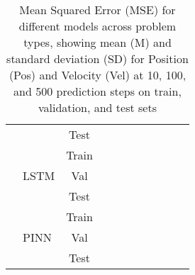 \documentclass[12pt,a4paper]{article}
\begin{document}
\begin{table}[htbp]
\begin{tabular}{@{}llccccccccc@{}}
  & & Test & & & & & & \\
  \cmidrule(lr){2-9}
  & \multirow{3}{*}{LSTM}
  & Train & & & & & & \\
  & & Val & & & & & & \\
  & & Test & & & & & & \\
  \cmidrule(lr){2-9}
  & \multirow{3}{*}{PINN}
  & Train & & & & & & \\
  & & Val & & & & & & \\
  & & Test & & & & & & \\
  \bottomrule
  \end{tabular}
  \caption{Mean Squared Error (MSE) for different models across problem types, showing mean (M) and standard deviation (SD) for Position (Pos) and Velocity (Vel) at 10, 100, and 500 prediction steps on train, validation, and test sets}
  \label{tab:model_comprehensive_mse_compact}
\end{table}
\end{document}
